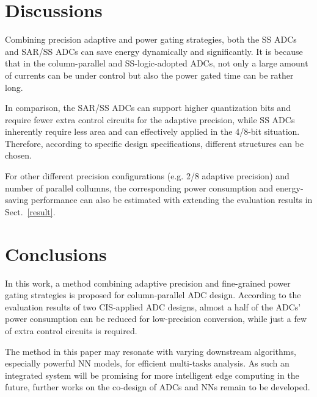 \documentclass[conference]{IEEEtran}
\begin{document}
\section{Discussions}\label{discussion}
Combining precision adaptive and power gating strategies, both the SS ADCs and SAR/SS ADCs can save energy dynamically and significantly. 
It is because that in the column-parallel and SS-logic-adopted ADCs, not only a large amount of currents can be under control but also the power gated time can be rather long. 

In comparison, the SAR/SS ADCs can support higher quantization bits and require fewer extra control circuits for the adaptive precision, 
while SS ADCs inherently require less area and can effectively applied in the 4/8-bit situation. 
Therefore, according to specific design specifications, different structures can be chosen. 

For other different precision configurations (e.g. 2/8 adaptive precision) and number of parallel collumns, 
the corresponding power consumption and energy-saving performance can also be estimated with extending the evaluation results in Sect.~\ref{result}. 

\section{Conclusions}\label{conclusion}

In this work, a method combining adaptive precision and fine-grained power gating strategies is proposed for column-parallel ADC design. 
According to the evaluation results of two CIS-applied ADC designs, almost a half of the ADCs’ power consumption can be reduced for low-precision conversion, 
while just a few of extra control circuits is required.

The method in this paper may resonate with varying downstream algorithms, especially powerful NN models, for efficient multi-tasks analysis. 
As such an integrated system will be promising for more intelligent edge computing in the future, further works on the co-design of ADCs and NNs remain to be developed.



\end{document}
